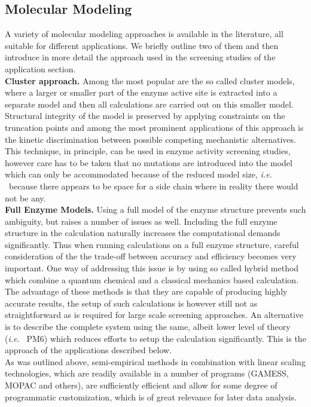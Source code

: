 \subsection{Molecular Modeling}\label{sec:modeling}
A variety of molecular modeling approaches is available in the literature, all suitable for different applications.
We briefly outline two of them and then introduce in more detail the approach used in the screening studies of the application section.\\
\textbf{Cluster approach.}
Among the most popular are the so called cluster models, where a larger or smaller part of the enzyme active site is extracted into a separate model and then all calculations are carried out on this smaller model.
Structural integrity of the model is preserved by applying constraints on the truncation points and among the most prominent applications of this approach is the kinetic discrimination between possible competing mechanistic alternatives\cite{noodleman2004quantum, himo2006quantum, siegbahn2009recent}.
This technique, in principle, can be used in enzyme activity screening studies, however care has to be taken that no mutations are introduced into the model which can only be accommodated because of the reduced model size, \textit{i.e. } because there appears to be space for a side chain where in reality there would not be any.\\
\textbf{Full Enzyme Models.}
Using a full model of the enzyme structure prevents such ambiguity, but raises a number of issues as well.
Including the full enzyme structure in the calculation naturally increases the computational demands significantly.
Thus when running calculations on a full enzyme structure, careful consideration of the the trade-off between accuracy and efficiency becomes very important.
One way of addressing this issue is by using so called hybrid method which combine a quantum chemical and a classical mechanics based calculation.
The advantage of these methods is that they are capable of producing highly accurate results, the setup of such calculations is however still not as straightforward as is required for large scale screening approaches.
An alternative is to describe the complete system using the same, albeit lower level of theory (\textit{i.e. } PM6) which reduces efforts to setup the calculation significantly.
This is the approach of the applications described below.\\
As was outlined above, semi-empirical methods in combination with linear scaling technologies, which are readily available in a number of programs (GAMESS, MOPAC and others), are sufficiently efficient and allow for some degree of programmatic customization, which is of great relevance for later data analysis.\\
